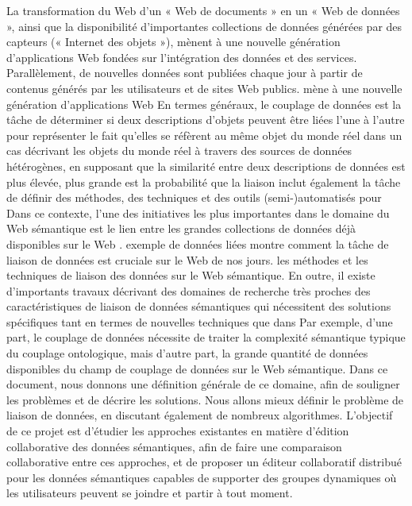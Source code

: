 \documentclass[12pt]{report}
\begin{document}
La transformation du Web d’un « Web de documents » en un « Web de données », ainsi que la disponibilité d’importantes collections de données générées par des capteurs (« Internet des objets »), mènent à une nouvelle génération d’applications Web fondées sur l’intégration des données et des services. Parallèlement, de nouvelles données sont publiées chaque jour à partir de contenus générés par les utilisateurs et de sites Web publics. mène à une nouvelle génération d’applications Web En termes généraux, le couplage de données est la tâche de déterminer si deux descriptions d’objets peuvent être liées l’une à l’autre pour représenter le fait qu’elles se réfèrent au même objet du monde réel dans un cas décrivant les objets du monde réel à travers des sources de données hétérogènes, en supposant que la similarité entre deux descriptions de données est plus élevée, plus grande est la probabilité que la liaison inclut également la tâche de définir des méthodes, des techniques et des outils (semi-)automatisés pour Dans ce contexte, l’une des initiatives les plus importantes dans le domaine du Web sémantique est le lien entre les grandes collections de données déjà disponibles sur le Web \cite{LDOW}. exemple de données liées montre comment la tâche de liaison de données est cruciale sur le Web de nos jours. les méthodes et les techniques de liaison des données sur le Web sémantique. En outre, il existe d’importants travaux décrivant des domaines de recherche très proches des caractéristiques de liaison de données sémantiques qui nécessitent des solutions spécifiques tant en termes de nouvelles techniques que dans Par exemple, d’une part, le couplage de données nécessite de traiter la complexité sémantique typique du couplage ontologique, mais d’autre part, la grande quantité de données disponibles du champ de couplage de données sur le Web sémantique. Dans ce document, nous donnons une définition générale de ce domaine, afin de souligner les problèmes et de décrire les solutions. Nous allons mieux définir le problème de liaison de données, en discutant également de nombreux algorithmes. L’objectif de ce projet est d’étudier les approches existantes en matière d’édition collaborative des données sémantiques, afin de faire une comparaison collaborative entre ces approches, et de proposer un éditeur collaboratif distribué pour les données sémantiques capables de supporter des groupes dynamiques où les utilisateurs peuvent se joindre et partir à tout moment.\cite{WLD}
\end{document}
